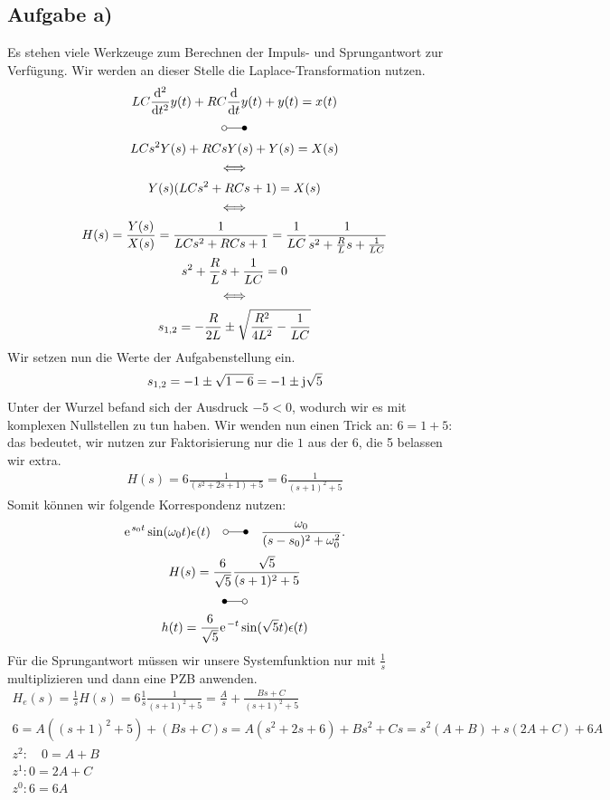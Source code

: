 \documentclass[11pt,a4paper,DIV=12]{scrartcl}
\begin{document}
\subsection{Aufgabe a)}
Es stehen viele Werkzeuge zum Berechnen der Impuls- und Sprungantwort zur Verfügung. Wir werden an dieser Stelle die Laplace-Transformation nutzen.
\begin{gather}
	LC \frac{\mathrm{d} ^2}{\mathrm{d} t^2}y(t)+RC\frac{\mathrm{d}}{\mathrm{d} t}y(t)+y(t)=x(t)\\
	\laplace\nonumber\\
	LCs^2Y(s)+RCsY(s)+Y(s)=X(s)\\
	\Longleftrightarrow\nonumber\\
	Y(s)(LCs^2+RCs+1)=X(s)\\
	\Longleftrightarrow\nonumber\\
	H(s)=\frac{Y(s)}{X(s)}=\frac{1}{LCs^2+RCs+1}=\frac{1}{LC}\frac{1}{s^2+\frac{R}{L}s+\frac{1}{LC}}\\
	s^2+\frac{R}{L}s+\frac{1}{LC}=0\\
	\Longleftrightarrow\nonumber\\
	s_{1,2}=-\frac{R}{2L}\pm\sqrt{\frac{R^2}{4L^2}-\frac{1}{LC}}
\end{gather}
Wir setzen nun die Werte der Aufgabenstellung ein.
\begin{gather}
	s_{1,2}=-1\pm\sqrt{1-6}=-1\pm\im\sqrt{5}
\end{gather}
Unter der Wurzel befand sich der Ausdruck $-5<0$, wodurch wir es mit komplexen Nullstellen zu tun haben. Wir wenden nun einen Trick an: $6 = 1 + 5$: das bedeutet, wir nutzen zur Faktorisierung nur die $1$ aus der $6$, die 5 belassen wir extra.
\begin{align}
	H(s)=6\frac{1}{(s^2+2s+1)+5}=6\frac{1}{(s+1)^2+5}
\end{align}
Somit können wir folgende Korrespondenz nutzen:
\begin{gather}
	\e^{s_0t}\sin(\omega_0 t)\epsilon(t)\quad\laplace\quad\frac{\omega_0}{(s-s_0)^2+\omega_0^2}.
\end{gather}
\begin{gather}
	H(s)=\frac{6}{\sqrt{5}}\frac{\sqrt{5}}{(s+1)^2+5}\\
	\Laplace\nonumber\\
	h(t)=\frac{6}{\sqrt{5}}\e^{-t}\sin(\sqrt{5}t)\epsilon(t)
\end{gather}
Für die Sprungantwort müssen wir unsere Systemfunktion nur mit $\frac{1}{s}$ multiplizieren und dann eine PZB anwenden.
\begin{gather}
	H_e(s)=\frac{1}{s}H(s)=6\frac{1}{s}\frac{1}{(s+1)^2+5}=\frac{A}{s}+\frac{Bs+C}{(s+1)^2+5}\\
	6=A((s+1)^2+5)+(Bs+C)s=A(s^2+2s+6)+Bs^2+Cs=s^2(A+B)+s(2A+C)+6A\\
	z^2:\quad0=A+B\\
	z^1:0=2A+C\\
	z^0:6=6A
\end{gather}
\end{document}
